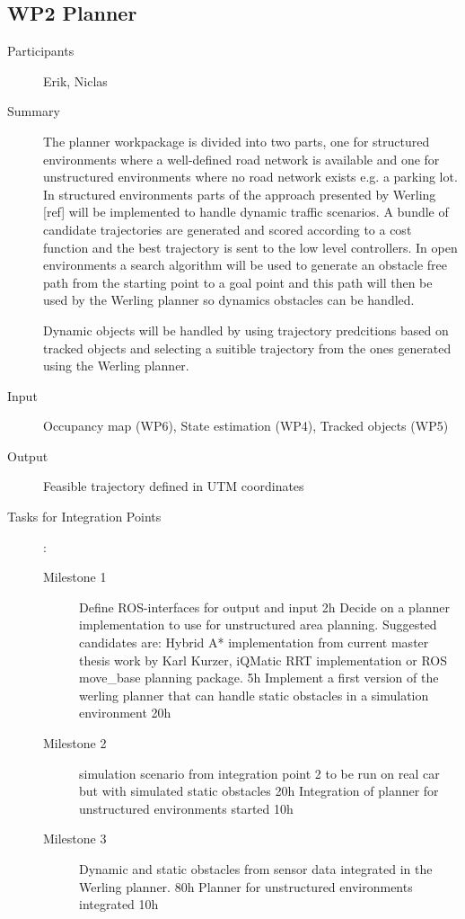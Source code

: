 \documentclass[11pt,a4paper]{article}
\begin{document}
\subsection{WP2 Planner}

\begin{description}
\item[Participants] Erik, Niclas
\item[Summary] The planner workpackage is divided into two parts, one
  for structured environments where a well-defined road network is
  available and one for unstructured environments where no road
  network exists e.g. a parking lot. In structured environments parts
  of the approach presented by Werling [ref] will be implemented to
  handle dynamic traffic scenarios. A bundle of candidate trajectories
  are generated and scored according to a cost function and the best
  trajectory is sent to the low level controllers. In open
  environments a search algorithm will be used to generate an obstacle
  free path from the starting point to a goal point and this path will
  then be used by the Werling planner so dynamics obstacles can be
  handled.

  Dynamic objects will be handled by using trajectory predcitions based 
  on tracked objects and selecting a suitible trajectory from the ones
  generated using the Werling planner.
  
\item[Input] Occupancy map (WP6), State estimation (WP4), Tracked objects (WP5)
\item[Output] Feasible trajectory defined in UTM coordinates
\item[Tasks for Integration Points]:\
	\begin{description}
		\item[Milestone 1] Define ROS-interfaces for output
                  and input 2h Decide on a planner implementation to
                  use for unstructured area planning. Suggested
                  candidates are: Hybrid A* implementation from
                  current master thesis work by Karl Kurzer, iQMatic
                  RRT implementation or ROS move\_base planning
                  package. 5h Implement a first version of the werling
                  planner that can handle static obstacles in a
                  simulation environment 20h
		\item[Milestone 2] simulation scenario from integration
                  point 2 to be run on real car but with simulated
                  static obstacles 20h Integration of planner for
                  unstructured environments started 10h
		\item[Milestone 3] Dynamic and static obstacles from
                  sensor data integrated in the Werling planner. 80h
                  Planner for unstructured environments integrated 10h
	\end{description}	 
\end{description}
\end{document}
